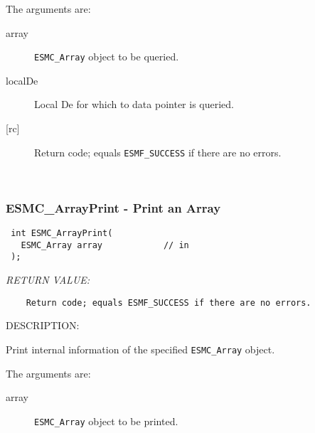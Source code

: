     The arguments are:
    \begin{description}
    \item[array] 
      {\tt ESMC\_Array} object to be queried.
    \item[localDe] 
      Local De for which to data pointer is queried.
    \item[{[rc]}]
      Return code; equals {\tt ESMF\_SUCCESS} if there are no errors.
    \end{description}
   
 
\mbox{}\hrulefill\ 
 
\subsubsection [ESMC\_ArrayPrint] {ESMC\_ArrayPrint - Print an Array}


  
\begin{verbatim} int ESMC_ArrayPrint(
   ESMC_Array array            // in
 );\end{verbatim}{\em RETURN VALUE:}
\begin{verbatim}    Return code; equals ESMF_SUCCESS if there are no errors.\end{verbatim}
{\sf DESCRIPTION:\\ }


  
    Print internal information of the specified {\tt ESMC\_Array} object.
  
    The arguments are:
    \begin{description}
    \item[array] 
      {\tt ESMC\_Array} object to be printed.
    \end{description}
  
\setlength{\parskip}{\oldparskip}
\setlength{\parindent}{\oldparindent}
\setlength{\baselineskip}{\oldbaselineskip}
